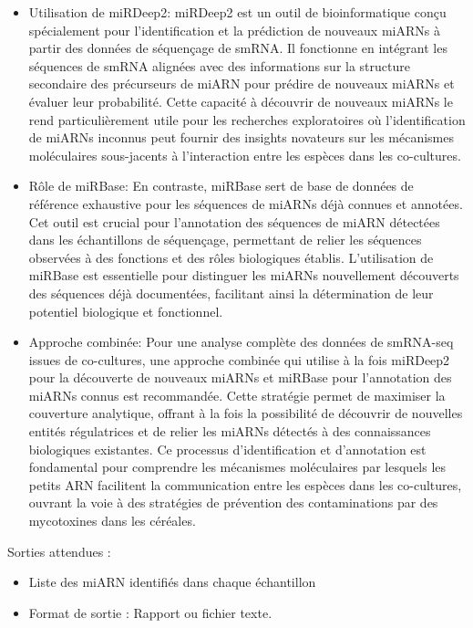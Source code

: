 \documentclass{report}
\begin{document}
\begin{itemize}
    \item Utilisation de miRDeep2:
    miRDeep2 est un outil de bioinformatique conçu spécialement pour l'identification et la prédiction de nouveaux miARNs à partir des données de séquençage de smRNA. Il fonctionne en intégrant les séquences de smRNA alignées avec des informations sur la structure secondaire des précurseurs de miARN pour prédire de nouveaux miARNs et évaluer leur probabilité. Cette capacité à découvrir de nouveaux miARNs le rend particulièrement utile pour les recherches exploratoires où l'identification de miARNs inconnus peut fournir des insights novateurs sur les mécanismes moléculaires sous-jacents à l'interaction entre les espèces dans les co-cultures.
    \item Rôle de miRBase:
    En contraste, miRBase sert de base de données de référence exhaustive pour les séquences de miARNs déjà connues et annotées. Cet outil est crucial pour l'annotation des séquences de miARN détectées dans les échantillons de séquençage, permettant de relier les séquences observées à des fonctions et des rôles biologiques établis. L'utilisation de miRBase est essentielle pour distinguer les miARNs nouvellement découverts des séquences déjà documentées, facilitant ainsi la détermination de leur potentiel biologique et fonctionnel.
    \item Approche combinée:
    Pour une analyse complète des données de smRNA-seq issues de co-cultures, une approche combinée qui utilise à la fois miRDeep2 pour la découverte de nouveaux miARNs et miRBase pour l'annotation des miARNs connus est recommandée. Cette stratégie permet de maximiser la couverture analytique, offrant à la fois la possibilité de découvrir de nouvelles entités régulatrices et de relier les miARNs détectés à des connaissances biologiques existantes. Ce processus d'identification et d'annotation est fondamental pour comprendre les mécanismes moléculaires par lesquels les petits ARN facilitent la communication entre les espèces dans les co-cultures, ouvrant la voie à des stratégies de prévention des contaminations par des mycotoxines dans les céréales.
\end{itemize} \vspace{.5cm}

\noindent Sorties attendues :
\begin{itemize}
    \item Liste des miARN identifiés dans chaque échantillon
    \item Format de sortie : Rapport ou fichier texte.
\end{itemize}
\end{document}
